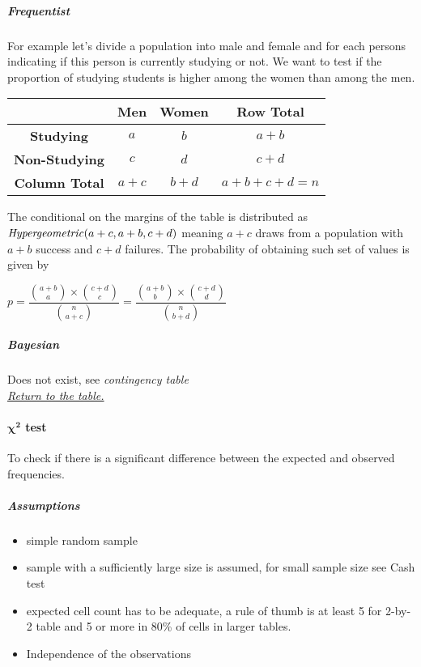 \subparagraph{Frequentist}
For example let's divide a population into male and female and for each persons indicating
if this person is currently studying or not. We want to test if the proportion of studying
students is higher among the women than among the men.
\begin{center}
    \begin{tabular}{|*{4}{c|}}
    \hline
    & \textbf{Men} & \textbf{Women} & \textbf{Row Total}\\
    \hline
    \textbf{Studying} & $a$ & $b$ & $a+b$ \\
    \hline
    \textbf{Non-Studying} & $c$ & $d$ & $c+d$ \\
    \hline
    \textbf{Column Total} & $a+c$ & $b+d$ & $a + b + c + d = n$ \\
    \hline
    \end{tabular}
\end{center}
The conditional on the margins of the table is distributed as $\text{\emph{Hypergeometric}}(a+c, a+b, c+d)$ meaning $a + c$ draws from a population with $a + b$ success and $c+d$ 
failures.
The probability of obtaining such set of values is given by
\begin{center}
    $p = \dfrac{{{a+b}\choose{a}}\times{{c+d}\choose{c}}}{{{n}\choose{a+c}}}
    = \dfrac{{{a+b}\choose{b}}\times{{c+d}\choose{d}}}{{{n}\choose{b+d}}}$
\end{center}

\subparagraph{Bayesian}
Does not exist, see \emph{contingency table} \\


\textit{\hyperref[statistical_method_table]{Return to the table.}}





\paragraph{$\bm{\chi^{2}}$ test}
To check if there is a significant difference between the expected and observed 
frequencies.
\subparagraph{Assumptions}
\begin{itemize}
    \item simple random sample
    \item sample with a sufficiently large size is assumed, for small sample size see Cash test
    \item expected cell count has to be adequate, a rule of thumb is at least 5 for 2-by-2
        table and 5 or more in 80\% of cells in larger tables.
    \item Independence of the observations
\end{itemize}

